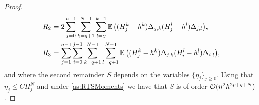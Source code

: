 \documentclass[10pt]{article}
\begin{document}
\begin{proof}
\begin{equation}
\begin{aligned}
		R_2 &= 2\sum_{j=0}^{n-1} \sum_{k=q+1}^{N-1} \sum_{l=q}^{k-1} \operatorname{\mathbb{E}} \big((H_j^k - h^k)\Delta_{j,k}(H_j^l - h^l) \Delta_{j,l}\big),\\
		R_3 &= \sum_{j=1}^{n-1}\sum_{i=0}^{j-1} \sum_{k=q+1}^{N-1}\sum_{l=q+1}^{N-1} \operatorname{\mathbb{E}}\big((H_j^k - h^k)\Delta_{j,k}(H_i^l - h^l) \Delta_{i,l}\big),
	\end{aligned}
	\end{equation}	
	and where the second remainder $S$ depends on the variables $\{\eta_j\}_{j\geq0}$. Using that $\eta_j\leq C H_j^N$ and under \cref{as:RTSMoments} we have that $S$ is of order $\mathcal{O}(n^2 h^{2p+q+N})$.


\end{proof}
\end{document}
